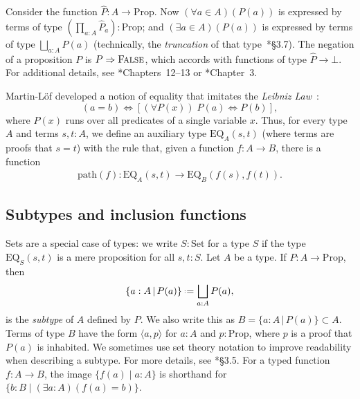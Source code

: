 \documentclass{amsart}
\numberwithin{lstfloat}{section}
\newcommand{\type}[1]{#1}
\newcommand{\defeq}{\mathrel{\hstretch{.13}{=}\hspace{.2ex}{=}}}
\theoremstyle{definition}
\theoremstyle{remark}
\numberwithin{equation}{section}
\begin{document}
Consider the function $\hat{P}:A\to \mathrm{Prop}$. 
Now $(\forall a\in A)(P(a))$
is expressed by terms of type 
$\left(\prod_{a:A}\hat{P}_a\right):\mathrm{Prop}$;
and $(\exists a\in A)(P(a))$ is expressed by terms of type 
$\bigsqcup_{a:A} P(a)$ (technically, the \emph{truncation} of that 
type~\cite{HoTT}*{\S 3.7}).
The negation of a proposition $P$ is
$P\Rightarrow \textsc{False}$, which accords with functions of type $\hat{P}\to
\bot$. For additional details, see
\cite{Hindley-Seldin}*{Chapters~12--13} or \cite{HoTT}*{Chapter~3}.

Martin-L\"of developed a notion
of equality that imitates the \emph{Leibniz Law}~\cite{Feldman}:  
\begin{equation*} 
    (a= b) \iff \left[(\forall P(x))\; P(a)\Longleftrightarrow P(b)\right],
\end{equation*}
where $P(x)$ runs over all predicates of a single variable $x$. 
Thus, for every type $A$ and terms $s,t:A$, we define 
an auxiliary type $\text{EQ}_A(s,t)$ (where terms are proofs that $s=t$) 
with the rule that, given a function $f:A\to B$, there is a function 
\begin{align}  \label{eqn:path-proof}
  \text{path}(f):\text{EQ}_A(s,t)\to \text{EQ}_B(f(s),f(t)). 
\end{align}



\subsection{Subtypes and inclusion functions}
\label{sec:subtypes}

Sets are a special case of types: 
we write $S:\mathrm{Set}$ for a type $S$ 
if the type $\mathrm{EQ}_S(s,t)$ is a mere
proposition for all $s,t:S$.
Let $A$ be a type. 
If $P : A \to \mathrm{Prop}$, then 
\[ 
  \{ a : \type{A} \,|\, P(a) \} \defeq \bigsqcup_{a: \type{A}} P(a),
\] 
is the \emph{subtype} of $\type{A}$ defined by $P$. We also write this as $B = \{ a
: \type{A} \,|\, P(a) \}\subset A$. Terms of type $B$ have the form $\langle a,
p\rangle$ for $a:A$ and $p:\mathrm{Prop}$, where $p$ is a proof that $P(a)$ is
inhabited. We sometimes use set theory notation to improve readability when
describing a subtype. For more details, see \cite{HoTT}*{\S3.5}.
For a typed function $f:A\to B$, the image $\{f(a)\mid a:A\}$ is shorthand 
for $\{b:B\mid (\exists a:A)(f(a)=b)\}$.
\end{document}
